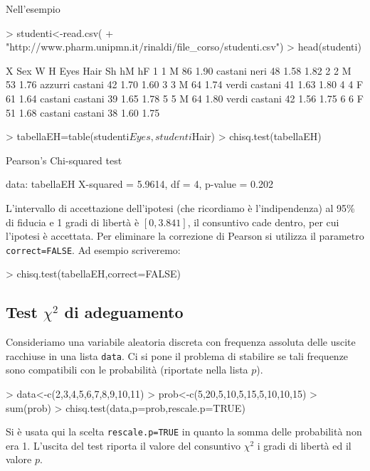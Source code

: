 \documentclass[onecolumn,11pt]{book}
\begin{document}
Nell'esempio
\begin{Schunk}
\begin{Sinput}
> studenti<-read.csv(
+ "http://www.pharm.unipmn.it/rinaldi/file_corso/studenti.csv")
> head(studenti)
\end{Sinput}
\begin{Soutput}
  X Sex  W    H    Eyes    Hair Sh   hM   hF
1 1   M 86 1.90 castani    neri 48 1.58 1.82
2 2   M 53 1.76 azzurri castani 42 1.70 1.60
3 3   M 64 1.74   verdi castani 41 1.63 1.80
4 4   F 61 1.64 castani castani 39 1.65 1.78
5 5   M 64 1.80   verdi castani 42 1.56 1.75
6 6   F 51 1.68 castani castani 38 1.60 1.75
\end{Soutput}
\begin{Sinput}
> tabellaEH=table(studenti$Eyes,studenti$Hair)
> chisq.test(tabellaEH)
\end{Sinput}
\begin{Soutput}
	Pearson's Chi-squared test

data:  tabellaEH
X-squared = 5.9614, df = 4, p-value = 0.202
\end{Soutput}
\end{Schunk}
L'intervallo di accettazione dell'ipotesi (che ricordiamo \`e l'indipendenza) al 95\% di fiducia e 1 gradi di libert\`a \`e  $[0, 3.841]$, il consuntivo cade dentro, per cui l'ipotesi \`e accettata.
Per eliminare la correzione di Pearson si utilizza il parametro  \texttt{correct=FALSE}.
Ad esempio scriveremo:
\begin{Schunk}
\begin{Sinput}
> chisq.test(tabellaEH,correct=FALSE)
\end{Sinput}
\end{Schunk}
  
\subsection{Test $\chi^2$  di adeguamento}
Consideriamo una variabile aleatoria discreta con frequenza assoluta delle uscite racchiuse in una lista \texttt{data}. Ci si pone il problema di stabilire se tali frequenze sono compatibili con le probabilit\`a (riportate nella lista $p$).
\begin{Schunk}
\begin{Sinput}
> data<-c(2,3,4,5,6,7,8,9,10,11)
> prob<-c(5,20,5,10,5,15,5,10,10,15)
> sum(prob)  
> chisq.test(data,p=prob,rescale.p=TRUE)
\end{Sinput}
\end{Schunk}
Si \`e usata qui la scelta \texttt{rescale.p=TRUE} in quanto la somma delle  probabilit\`a non era 1. 
L'uscita del test riporta il valore del consuntivo $\chi^2$ i gradi di libert\`a ed il valore $p$.   
\end{document}
